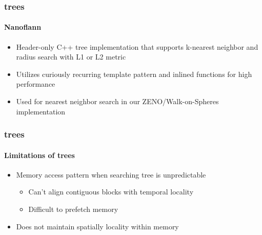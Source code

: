 \begin{frame}
  \frametitle{\kd trees}
  \framesubtitle{Nanoflann}

  \begin{itemize}
    \item Header-only C++ \kd tree implementation that supports k-nearest neighbor and radius search with 
      L1 or L2 metric
    \item Utilizes curiously recurring template pattern and inlined functions for high performance
    \item Used for nearest neighbor search in our ZENO/Walk-on-Spheres implementation 
  \end{itemize}

\end{frame}


\begin{frame}
  \frametitle{\kd trees}
  \framesubtitle{Limitations of trees}

  \begin{itemize}
    \item Memory access pattern when searching tree is unpredictable
      \begin{itemize}
        \item Can't align contiguous blocks with temporal locality
        \item Difficult to prefetch memory
      \end{itemize}
    \item Does not maintain spatially locality within memory
  \end{itemize}
\end{frame}

